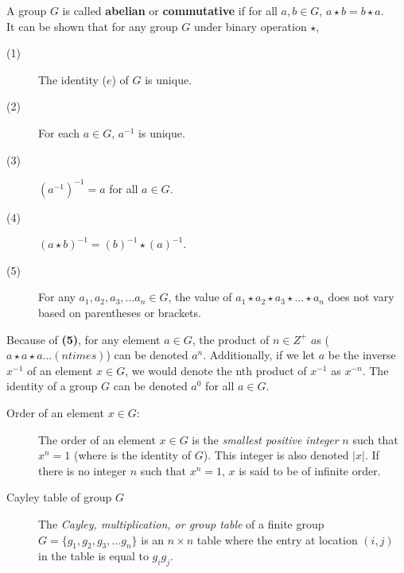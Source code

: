 \documentclass[12pt,letterpaper]{article}
\begin{document}
A group $G$ is called \textbf{abelian} or \textbf{commutative} if for all $a, b \in G$, $a \star b = b \star a$. \\

It can be shown that for any group $G$ under binary operation $\star$, 

\begin{description}
	\item[(1)] The identity ($e$) of $G$ is unique.
	\item[(2)] For each $a \in G$, $a^{-1}$ is unique.
	\item[(3)] $(a^{-1})^{-1} = a$ for all $a \in G$.
	\item[(4)] $(a \star b)^{-1} = (b)^{-1} \star (a)^{-1}$.
	\item[(5)] For any $a_{1}, a_{2}, a_{3}, ... a_{n} \in G$, the value of $a_{1} \star a_{2} \star a_{3} \star ... \star a_{n}$ does not vary based on parentheses or brackets.
\end{description}

Because of \textbf{(5)}, for any element $a \in G$, the product of $n \in Z^{+}$ $a$s ($a \star a \star a ... (n times)$) can be denoted $a^{n}$. Additionally, if we let $a$ be the inverse $x^{-1}$ of an element $x \in G$, we would denote the nth product of $x^{-1}$ as $x^{-n}$. The identity of a group $G$ can be denoted $a^{0}$ for all $a \in G$. 

\begin{description}
	\item[\boldmath Order of an element $x \in G$:] The order of an element $x \in G$ is the \textit{smallest positive integer} $n$ such that $x^{n} = 1$ (where is the identity of $G$). This integer is also denoted $|x|$. If there is no integer $n$ such that $x^{n} = 1$, $x$ is said to be of infinite order.
\end{description}

\begin{description}
	\item[\boldmath Cayley table of group $G$] The \textit{Cayley, multiplication, or group table} of a finite group $G = \{g_{1}, g_{2}, g_{3}, ... g_{n}\}$ is an $n \times n$ table where the entry at location $(i, j)$ in the table is equal to $g_{i}g_{j}$.
\end{description}
\end{document}
